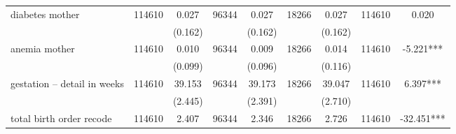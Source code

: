 \begin{tabular}{@{\extracolsep{5pt}}lcccccccc}
diabetes mother   & 114610    & 0.027    & 96344    & 0.027    & 18266    & 0.027    & 114610    & 0.020   \\                                                                                                                                                                                                                                                  
 &   & (0.162)  &   & (0.162)  &   & (0.162)  &   &  \\ [1ex]                                                                                                                                                                                                                                                                                                  
anemia mother   & 114610    & 0.010    & 96344    & 0.009    & 18266    & 0.014    & 114610    & -5.221***   \\                                                                                                                                                                                                                                                
 &   & (0.099)  &   & (0.096)  &   & (0.116)  &   &  \\ [1ex]                                                                                                                                                                                                                                                                                                  
gestation -- detail in weeks   & 114610    & 39.153    & 96344    & 39.173    & 18266    & 39.047    & 114610    & 6.397***   \\                                                                                                                                                                                                                               
 &   & (2.445)  &   & (2.391)  &   & (2.710)  &   &  \\ [1ex]                                                                                                                                                                                                                                                                                                  
total birth order recode   & 114610    & 2.407    & 96344    & 2.346    & 18266    & 2.726    & 114610    & -32.451***   \\                                                                                                                                                                                                                                    

\end{tabular}
